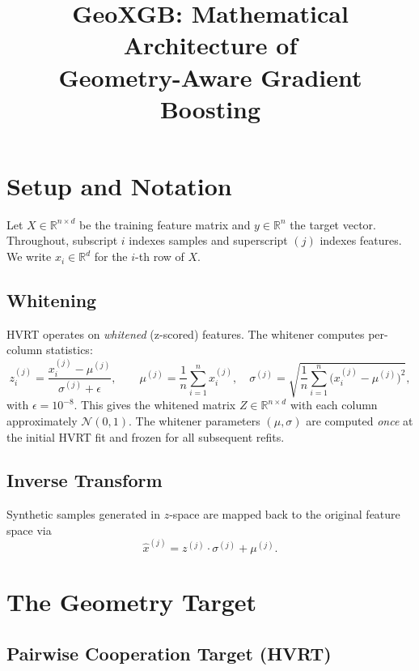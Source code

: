 \documentclass[11pt,a4paper]{article}
\title{GeoXGB: Mathematical Architecture of\\Geometry-Aware Gradient Boosting}
\author{}
\date{}
\newcommand{\R}{\mathbb{R}}
\theoremstyle{definition}
\begin{document}
\maketitle

\section{Setup and Notation}

Let $X \in \R^{n \times d}$ be the training feature matrix and $y \in \R^n$ the
target vector.  Throughout, subscript $i$ indexes samples and superscript $(j)$
indexes features.  We write $x_i \in \R^d$ for the $i$-th row of $X$.

\subsection{Whitening}

HVRT operates on \emph{whitened} (z-scored) features.  The whitener computes
per-column statistics:
\begin{equation}
    z_i^{(j)} = \frac{x_i^{(j)} - \mu^{(j)}}{\sigma^{(j)} + \epsilon},
    \qquad
    \mu^{(j)} = \frac{1}{n}\sum_{i=1}^{n} x_i^{(j)},
    \quad
    \sigma^{(j)} = \sqrt{\frac{1}{n}\sum_{i=1}^{n} \bigl(x_i^{(j)} - \mu^{(j)}\bigr)^2},
\end{equation}
with $\epsilon = 10^{-8}$.  This gives the whitened matrix $Z \in \R^{n \times d}$
with each column approximately $\mathcal{N}(0,1)$.  The whitener parameters
$(\mu, \sigma)$ are computed \emph{once} at the initial HVRT fit and frozen
for all subsequent refits.

\subsection{Inverse Transform}

Synthetic samples generated in $z$-space are mapped back to the original feature
space via
\begin{equation}
    \hat{x}^{(j)} = z^{(j)} \cdot \sigma^{(j)} + \mu^{(j)}.
\end{equation}


\section{The Geometry Target}

\subsection{Pairwise Cooperation Target (HVRT)}
\end{document}
